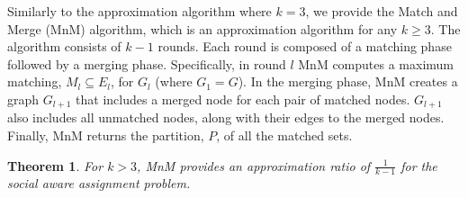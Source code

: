 \documentclass[letterpaper]{article} %
\newtheorem{theorem}{Theorem}
\begin{document}
Similarly to the approximation algorithm where $k=3$, we provide the Match and Merge (MnM) algorithm, which is an approximation algorithm for any $k \geq 3$.
The algorithm consists of $k-1$ rounds. Each round is composed of a matching phase followed by a merging phase.
Specifically, in round $l$ MnM computes a maximum matching, $M_l \subseteq E_l$, for $G_l$ (where $G_1 = G$). In the merging phase, MnM creates a graph $G_{l+1}$ that includes a merged node for each pair of matched nodes. $G_{l+1}$ also includes all unmatched nodes, along with their edges to the merged nodes.
Finally, MnM returns the partition, $P$, of all the matched sets.
\begin{theorem}
For $k>3$, MnM provides an approximation ratio of $\frac{1}{k-1}$ for the social aware assignment problem.
\end{theorem}
\end{document}
